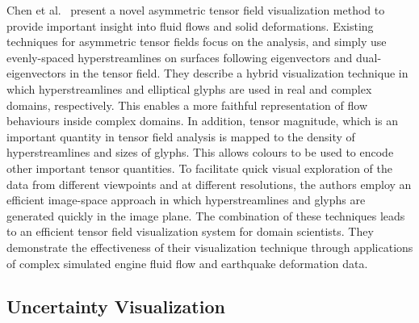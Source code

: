 Chen et al.~\cite{chen11AsymmetricTensor} present a novel asymmetric tensor field visualization method to provide important insight into fluid flows and solid deformations. Existing techniques for asymmetric tensor fields focus on the analysis, and simply use evenly-spaced hyperstreamlines on surfaces following eigenvectors and dual-eigenvectors in the tensor field. 
They describe a hybrid visualization technique in which hyperstreamlines and elliptical glyphs are used in real and complex domains, respectively. 
This enables a more faithful representation of flow behaviours inside complex domains. 
In addition, tensor magnitude, which is an important quantity in tensor field analysis is mapped to the density of hyperstreamlines and sizes of glyphs. 
This allows colours to be used to encode other important tensor quantities. 
To facilitate quick visual exploration of the data from different viewpoints and at different resolutions, the authors employ an efficient image-space approach in which hyperstreamlines and glyphs are generated quickly in the image plane. 
The combination of these techniques leads to an efficient tensor field visualization system for domain scientists. 
They demonstrate the effectiveness of their visualization technique through applications of complex simulated engine fluid flow and earthquake deformation data. 

\subsection{Uncertainty Visualization}

